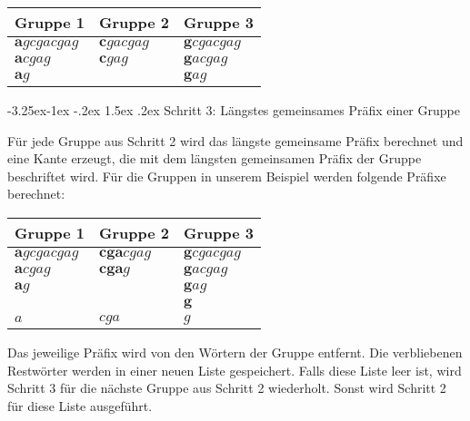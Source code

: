 \documentclass[12pt]{report}
\makeatletter
\renewcommand\paragraph{\@startsection{paragraph}{4}{\z@}%
    {-3.25ex\@plus -1ex \@minus -.2ex}%
    {1.5ex \@plus .2ex}%
    {\normalfont\normalsize\bfseries}}
\makeatother
\begin{document}
\begin{center}
\begin{tabular}{l l l}
    \toprule
    Gruppe 1                 & Gruppe 2               & Gruppe 3                \\
    \midrule
    $\boldsymbol{a}gcgacgag$ & $\boldsymbol{c}gacgag$ & $\boldsymbol{g}cgacgag$ \\
    $\boldsymbol{a}cgag$     & $\boldsymbol{c}gag$    & $\boldsymbol{g}acgag$   \\
    $\boldsymbol{a}g$        &                        & $\boldsymbol{g}ag$      \\
    \bottomrule
\end{tabular}
\end{center}

\paragraph{Schritt 3: Längstes gemeinsames Präfix einer Gruppe}

Für jede Gruppe aus Schritt 2 wird das längste gemeinsame Präfix berechnet und eine Kante erzeugt, die mit dem längsten gemeinsamen Präfix der Gruppe beschriftet wird. Für die Gruppen in unserem Beispiel werden folgende Präfixe berechnet:

\begin{center}
\begin{tabular}{l l l}
    \toprule
    Gruppe 1                 & Gruppe 2               & Gruppe 3                \\
    \midrule
    $\boldsymbol{a}gcgacgag$ & $\boldsymbol{cga}cgag$ & $\boldsymbol{g}cgacgag$ \\
    $\boldsymbol{a}cgag$     & $\boldsymbol{cga}g$    & $\boldsymbol{g}acgag$   \\
    $\boldsymbol{a}g$        &                        & $\boldsymbol{g}ag$      \\
                             &                        & $\boldsymbol{g}$        \\
    \midrule
    $a$                      & $cga$                  & $g$                     \\
    \bottomrule
\end{tabular}
\end{center}
Das jeweilige Präfix wird von den Wörtern der Gruppe entfernt. Die verbliebenen Restwörter werden in einer neuen Liste gespeichert. Falls diese Liste leer ist, wird Schritt 3 für die nächste Gruppe aus Schritt 2 wiederholt. Sonst wird Schritt 2 für diese Liste ausgeführt.
\end{document}
